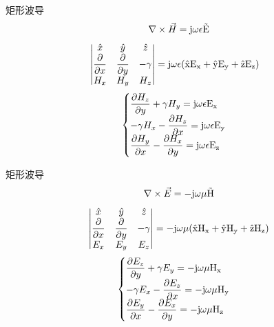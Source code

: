\begin{frame}{矩形波导}
    \begin{align*}
        \nabla\times\vec{H}=\rm{j}\omega\epsilon \vec{E}
    \end{align*}
    \begin{align*}
         & \begin{vmatrix}
               \hat{x}                      & \hat{y}                      & \hat{z} \\
               \dfrac{\partial}{\partial x} & \dfrac{\partial}{\partial y} & -\gamma \\
               H_x                          & H_y                          & H_z     \\
           \end{vmatrix}
        =\rm{j}\omega\epsilon(\hat{x}E_x+\hat{y}E_y+\hat{z}E_z)
    \end{align*}
    \begin{align}
        \begin{cases}
            \dfrac{\partial H_z}{\partial y}+\gamma H_y=\rm{j}\omega\epsilon E_x  \\
            -\gamma H_x-\dfrac{\partial H_z}{\partial x}=\rm{j}\omega\epsilon E_y \\
            \dfrac{\partial H_y}{\partial x}-\dfrac{\partial H_x}{\partial y}=\rm{j}\omega\epsilon E_z
        \end{cases}
    \end{align}
\end{frame}

\begin{frame}{矩形波导}
    \begin{align*}
        \nabla\times\vec{E}=-\rm{j}\omega\mu \vec{H}
    \end{align*}
    \begin{align*}
        \begin{vmatrix}
            \hat{x}                      & \hat{y}                      & \hat{z} \\
            \dfrac{\partial}{\partial x} & \dfrac{\partial}{\partial y} & -\gamma \\
            E_x                          & E_y                          & E_z     \\
        \end{vmatrix}
        =-\rm{j}\omega\mu(\hat{x}H_x+\hat{y}H_y+\hat{z}H_z)
    \end{align*}
    \begin{align}
        \begin{cases}
            \dfrac{\partial E_z}{\partial y}+\gamma E_y=-\rm{j}\omega\mu H_x  \\
            -\gamma E_x-\dfrac{\partial E_z}{\partial x}=-\rm{j}\omega\mu H_y \\
            \dfrac{\partial E_y}{\partial x}-\dfrac{\partial E_x}{\partial y}=-\rm{j}\omega\mu H_z
        \end{cases}
    \end{align}
\end{frame}

